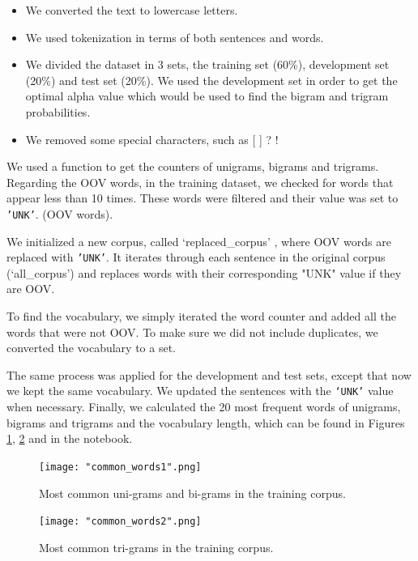 \documentclass[11pt, a4paper]{article}
\begin{document}
	\begin{itemize}
		\item We converted the text to lowercase letters.
		\item We used tokenization in terms of both sentences and words.
		\item We divided the dataset in 3 sets, the training set (60\%), development set (20\%) and test set (20\%). We used the development set in order to get the optimal alpha value which would be used to find the bigram and trigram probabilities.
		\item We removed some special characters, such as [ ] ? !
		
	\end{itemize}

	
	We used a function to get the counters of unigrams, bigrams and trigrams.  Regarding the OOV words, in the training dataset, we checked for words that appear less than 10 times. These words were filtered and their value was set to \texttt{'UNK'}. (OOV words).
	
	We initialized a new corpus, called ‘replaced\_corpus’ , where  OOV words are replaced with \texttt{'UNK'}. It iterates through each sentence in the original corpus (‘all\_corpus’) and replaces words with their corresponding "UNK" value if they are OOV.
	
	To find the vocabulary, we simply iterated the word counter and added all the words that were not OOV. To make sure we did not include duplicates, we converted the vocabulary to a set.
	
	The same process was applied for the development and test sets, except that now we kept the same vocabulary. We updated the sentences with the \texttt{‘UNK’} value when necessary. Finally, we calculated the 20 most frequent words of unigrams, bigrams and trigrams and the vocabulary length, which can be found in Figures \ref{fig::common_words_1}, \ref{fig::common_words_2} and in the notebook.
	
	 \begin{figure}
	    \centering
	    \texttt{[image: "common\_words1".png]}
	    \caption{Most common uni-grams and bi-grams in the training corpus.}
	    \label{fig::common_words_1}
	\end{figure}
	
	 \begin{figure}
	    \centering
	    \texttt{[image: "common\_words2".png]}
		\caption{Most common tri-grams in the training corpus.}
	    \label{fig::common_words_2}
	\end{figure}
	
\end{document}
